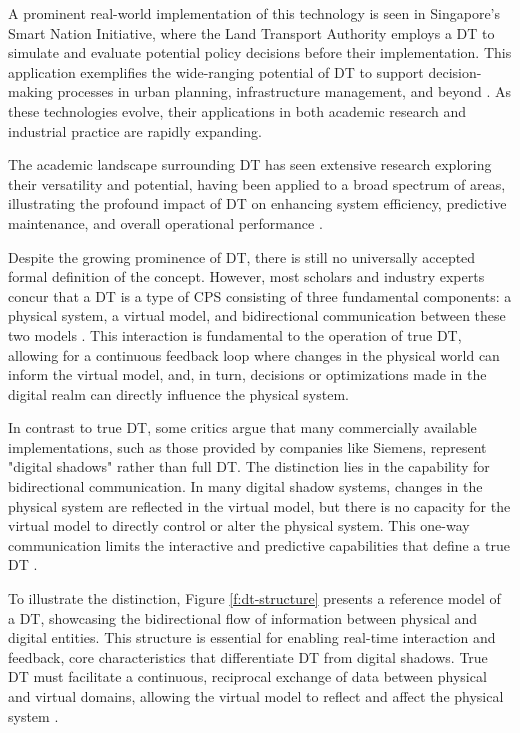 A prominent real-world implementation of this technology is seen in Singapore's Smart Nation Initiative, where the Land Transport Authority employs a \ac{DT} to simulate and evaluate potential policy decisions before their implementation. This application exemplifies the wide-ranging potential of \ac{DT} to support decision-making processes in urban planning, infrastructure management, and beyond \cite{isprs-archives-XLII-4-W7-37-2017}. As these technologies evolve, their applications in both academic research and industrial practice are rapidly expanding.

The academic landscape surrounding \ac{DT} has seen extensive research exploring their versatility and potential, having been applied to a broad spectrum of areas, illustrating the profound impact of \ac{DT} on enhancing system efficiency, predictive maintenance, and overall operational performance \cite{8361285, TAO2018169, isprs-archives-XLII-4-W7-37-2017, 10.1007/978-3-030-23162-0_19, 6296978}.

Despite the growing prominence of \ac{DT}, there is still no universally accepted formal definition of the concept. However, most scholars and industry experts concur that a \ac{DT} is a type of \ac{CPS} consisting of three fundamental components: a physical system, a virtual model, and bidirectional communication between these two models \cite{TaoFei, 8477101, ROSEN2015567}.
This interaction is fundamental to the operation of true \ac{DT}, allowing for a continuous feedback loop where changes in the physical world can inform the virtual model, and, in turn, decisions or optimizations made in the digital realm can directly influence the physical system.

In contrast to true \ac{DT}, some critics argue that many commercially available implementations, such as those provided by companies like Siemens, represent "digital shadows" rather than full \ac{DT}. The distinction lies in the capability for bidirectional communication. In many digital shadow systems, changes in the physical system are reflected in the virtual model, but there is no capacity for the virtual model to directly control or alter the physical system. This one-way communication limits the interactive and predictive capabilities that define a true DT \cite{CIMINO2019103130}.

To illustrate the distinction, Figure \ref{f:dt-structure} presents a reference model of a \ac{DT}, showcasing the bidirectional flow of information between physical and digital entities. This structure is essential for enabling real-time interaction and feedback, core characteristics that  differentiate \ac{DT} from digital shadows. True \ac{DT} must facilitate a continuous, reciprocal exchange of data between physical and virtual domains, allowing the virtual model to reflect and affect the physical system \cite{dt_model}.

